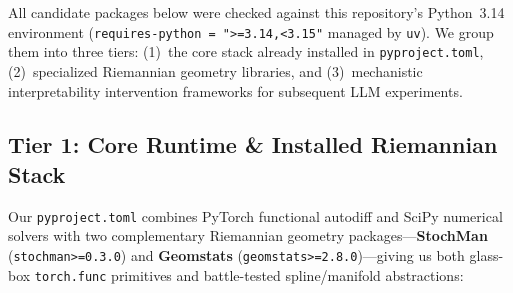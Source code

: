 \documentclass[11pt,a4paper]{article}
\theoremstyle{definition}
\begin{document}
All candidate packages below were checked against this repository's Python~3.14 environment (\texttt{requires-python = ">=3.14,<3.15"} managed by \texttt{uv}). We group them into three tiers: (1)~the core stack already installed in \texttt{pyproject.toml}, (2)~specialized Riemannian geometry libraries, and (3)~mechanistic interpretability intervention frameworks for subsequent LLM experiments.

\subsection{Tier 1: Core Runtime \& Installed Riemannian Stack}

Our \texttt{pyproject.toml} combines PyTorch functional autodiff and SciPy numerical solvers with two complementary Riemannian geometry packages---\textbf{StochMan} (\texttt{stochman>=0.3.0}) and \textbf{Geomstats} (\texttt{geomstats>=2.8.0})---giving us both glass-box \texttt{torch.func} primitives and battle-tested spline/manifold abstractions:
\end{document}
